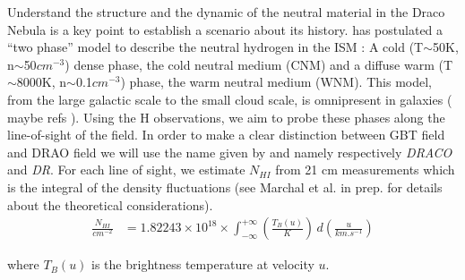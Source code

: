 \documentclass[traditabstract]{aa}
\begin{document}
Understand the structure and the dynamic of the neutral material in the Draco Nebula is a key point to establish a scenario about
its history. \cite{field1969cosmic} has postulated a ``two phase'' model to describe the neutral hydrogen in the ISM : 
A cold (T$\sim$50K, n$\sim$50$cm^{-3}$) dense phase, the cold neutral medium (CNM) and a diffuse warm (T$\sim$8000K, 
n$\sim$0.1$cm^{-3}$) phase, the warm neutral medium (WNM). This model, from the large galactic scale to the 
small cloud scale, is omnipresent in galaxies (\color{red} maybe refs \color{black}).
Using the H observations, we aim to probe these phases along the line-of-sight of the field. In order to make a clear 
distinction between GBT field and DRAO field we will use the name given by \cite{Martin_2015} and \cite{Blagrave_2017} namely 
respectively \textit{DRACO} and \textit{DR}. For each line of sight, we estimate $N_{HI}$ from 21 cm measurements which is 
the integral of the density fluctuations (see Marchal et al. in prep. for details about the theoretical considerations). \\
\begin{align}
  \frac{N_{HI}}{cm^{-2}} &= 1.82243 \times 10^{18} \times \int_{-\infty}^{+\infty} \left( \frac{T_B(u)}{K} 
  \right) \, d\left( \frac{u}{km.s^{-1}}\right) 
  \label{eq::NHI}
\end{align}

\noindent
where $T_B(u)$ is the brightness temperature at velocity $u$.
\end{document}
